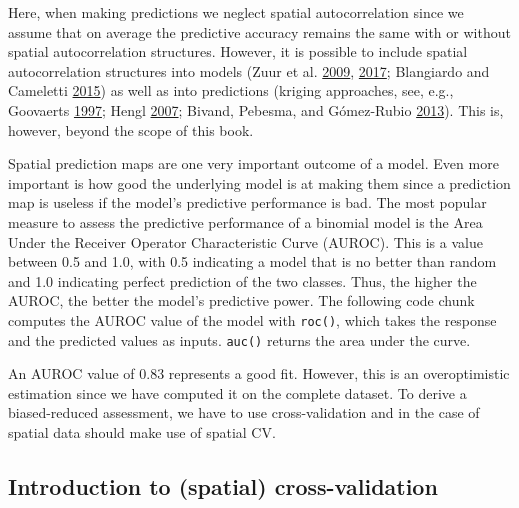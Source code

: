 \documentclass[]{krantz}
\newenvironment{Shaded}{\begin{snugshade}}{\end{snugshade}}
\newcommand{\CommentTok}[1]{\textcolor[rgb]{0.37,0.37,0.37}{\textit{#1}}}
\newcommand{\KeywordTok}[1]{\textcolor[rgb]{0.27,0.27,0.27}{\textbf{#1}}}
\newcommand{\NormalTok}[1]{#1}
\newcommand{\OperatorTok}[1]{\textcolor[rgb]{0.43,0.43,0.43}{\textbf{#1}}}
\begin{document}
Here, when making predictions we neglect spatial autocorrelation since we assume that on average the predictive accuracy remains the same with or without spatial autocorrelation structures.
However, it is possible to include spatial autocorrelation structures into models (Zuur et al. \protect\hyperlink{ref-zuur_mixed_2009}{2009}, \protect\hyperlink{ref-zuur_beginners_2017}{2017}; Blangiardo and Cameletti \protect\hyperlink{ref-blangiardo_spatial_2015}{2015}) as well as into predictions (kriging approaches, see, e.g., Goovaerts \protect\hyperlink{ref-goovaerts_geostatistics_1997}{1997}; Hengl \protect\hyperlink{ref-hengl_practical_2007}{2007}; Bivand, Pebesma, and Gómez-Rubio \protect\hyperlink{ref-bivand_applied_2013}{2013}).
This is, however, beyond the scope of this book.

Spatial prediction maps are one very important outcome of a model.
Even more important is how good the underlying model is at making them since a prediction map is useless if the model's predictive performance is bad.
The most popular measure to assess the predictive performance of a binomial model is the Area Under the Receiver Operator Characteristic Curve (AUROC).
This is a value between 0.5 and 1.0, with 0.5 indicating a model that is no better than random and 1.0 indicating perfect prediction of the two classes.
Thus, the higher the AUROC, the better the model's predictive power.
The following code chunk computes the AUROC value of the model with \texttt{roc()}, which takes the response and the predicted values as inputs.
\texttt{auc()} returns the area under the curve.

\begin{Shaded}
\end{Shaded}

An AUROC value of 0.83 represents a good fit.
However, this is an overoptimistic estimation since we have computed it on the complete dataset.
To derive a biased-reduced assessment, we have to use cross-validation and in the case of spatial data should make use of spatial CV.

\hypertarget{intro-cv}{%
\subsection{Introduction to (spatial) cross-validation}\label{intro-cv}}
\end{document}

